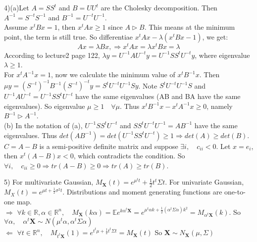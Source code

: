 \documentclass[11pt,english]{article}
\newcommand{\X}{\mathbf{X}}
\newcommand{\E}{\mathbb{E}}
\begin{document}
4)(a)Let $A = SS^t$ and $B=UU^t$ are the Cholesky decomposition.  Then $A^{-1} = S^{-t}S^{-1}$ and $B^{-1} = U^{-t}U^{-1}$.\\
 Assume $x^tBx = 1$, then $x^tAx \geq 1$ since $A\rhd B$.  This means at the minimum point, the term is still true.  So differentiae $x^tAx - \lambda (x^tBx -1)$, we get:\\
$$ Ax = \lambda Bx, \Rightarrow x^tAx = \lambda x^tBx = \lambda$$
According to lecture2 page 122, $\lambda y = U^{-1}AU^{-t}y = U^{-1}SS^{t}U^{-t}y$, where eigenvalue $\lambda \geq 1$.\\
For $x^tA^{-1}x = 1$, now we calculate the minimum value of $x^tB^{-1}x$.  Then $\mu y = (S^{-t})^{-1}B^{-1}(S^{-t})^{-t} y = S^{t}U^{-t}U^{-1}S y $.  Note $S^{t}U^{-t}U^{-1}S$ and $U^{-1}AU^{-t} = U^{-1}SS^{t}U^{-t}$ have the same eigenvalues (AB and BA have the same eigenvalues).  So eigenvalue $\mu \geq 1 \quad \forall \mu$. Thus $x^tB^{-1}x - x^tA^{-1}x \geq 0$, namely $ B^{-1} \rhd A^{-1}$.\\
(b) In the notation of (a), $U^{-1}SS^{t}U^{-t}$ and $SS^{t}U^{-t}U^{-1} = AB^{-1}$ have the same eigenvalues.  Thus $det(AB^{-1})=det(U^{-1}SS^{t}U^{-t}) \geq 1 \Rightarrow det(A) \geq det(B)$. \\
$C = A-B$ is a semi-positive definite matrix and suppose $\exists i,\quad c_{ii} < 0 $.  Let $x = e_i$, then $x^t(A-B)x < 0$, which contradicts the condition.  So $\forall i, \quad c_{ii} \geq 0 \Rightarrow tr(A-B) \geq 0 \Rightarrow tr(A) \ge tr(B)$.\par

5) For multivariate Gaussian, $M_{\X}(t) = e^{\mu^t t} + \frac{1}{2}t^t\Sigma t$.  For univariate Gaussian, $M_X(t) = e^{\mu t+ \frac{1}{2}\sigma^2t}$.  Distributions and moment generating functions are one-to-one map.\\
$\Rightarrow$     $\forall k \in \mathbb{R}, \alpha \in \mathbb{R}^n, \quad   M_{\X}(k\alpha) = \E e^{k\alpha^t\X} =  e^{\mu^t\alpha k + \frac{1}{2}(\alpha^t \Sigma \alpha)k^2} = M_{\alpha^t\X}(k)$.  So $\forall \alpha,\quad \alpha^t\X\sim N(\mu^t\alpha, \alpha^t \Sigma \alpha) $\\
$\Leftarrow$     $\forall t \in \mathbb{R}^n,\quad M_{t^t\X}(1) = e^{t^t\mu + \frac{1}{2}t^t\Sigma t} = M_{\X}(t)$  So $\X \sim N_{\X}(\mu, \Sigma)$\par
\end{document}
